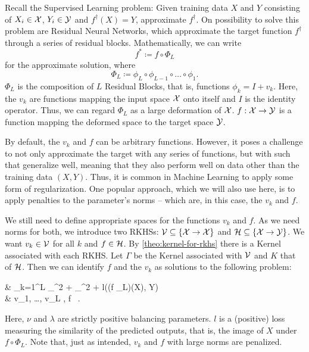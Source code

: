 Recall the Supervised Learning problem: Given training data $X$ and $Y$ consisting of $X_i \in \mathcal{X}$, $Y_i \in \mathcal{Y}$ and $f^\dagger(X) = Y$, approximate $f^\dagger$.
On possibility to solve this problem are Residual Neural Networks, which approximate the target function $f^\dagger$ through a series of residual blocks.
Mathematically, we can write
\begin{equation}
	f^\ast \coloneqq f \circ \Phi_L 
\end{equation}
for the approximate solution, where
\begin{equation}
\Phi_L \coloneqq \phi_L \circ \phi_{L-1} \circ \ldots \circ \phi_1.
\end{equation} 
$\Phi_L$ is the composition of $L$ Residual Blocks, that is, functions $\phi_k = I + v_k$.
Here, the $v_k$ are functions mapping the input space $\mathcal{X}$ onto itself and $I$ is the identity operator.
Thus, we can regard $\Phi_L$ as a large deformation of $\mathcal{X}$.
$f: \mathcal{X} \to \mathcal{Y}$ is a function mapping the deformed space to the target space $\mathcal{Y}$.

By default, the $v_k$ and $f$ can be arbitrary functions.
However, it poses a challenge to not only approximate the target with any series of functions, but with such that generalize well, meaning that they also perform well on data other than the training data $(X, Y)$.
Thus, it is common in Machine Learning \cite{goodfellow16} to apply some form of regularization.
One popular approach, which we will also use here, is to apply penalties to the parameter's norms -- which are, in this case, the $v_k$ and $f$.

We still need to define appropriate spaces for the functions $v_k$ and $f$.
As we need norms for both, we introduce two RKHSs:
$\mathcal{V} \subseteq \{\mathcal{X} \rightarrow \mathcal{X}\}$ and $\mathcal{H} \subseteq \{\mathcal{X} \rightarrow \mathcal{Y}\}$.
We want $v_k \in \mathcal{V}$ for all $k$ and $f \in \mathcal{H}$.
By \cref{theo:kernel-for-rkhs} there is a Kernel associated with each RKHS.
Let $\Gamma$ be the Kernel associated with $\mathcal{V}$ and $K$ that of $\mathcal{H}$.
Then we can identify $f$ and the $v_k$ as solutions to the following problem:
\begin{problem}
	\label{prob:min-v-f}
	\begin{cases}
		 & \nu \cdot {} \sum_{k=1}^{L} _\cV^2
		+ \lambda {}_\cH^2 
		+ l((f \circ \Phi_L)(X), Y) \\
		 & v_1, \ldots, v_L \in \cV, f \in \cH \ .
	\end{cases}
\end{problem}
Here, $\nu$ and $\lambda$ are strictly positive balancing parameters.
$l$ is a (positive) loss measuring the similarity of the predicted outputs, that is, the image of $X$ under $f \circ \Phi_L$.
Note that, just as intended, $v_k$ and $f$ with large norms are penalized.

